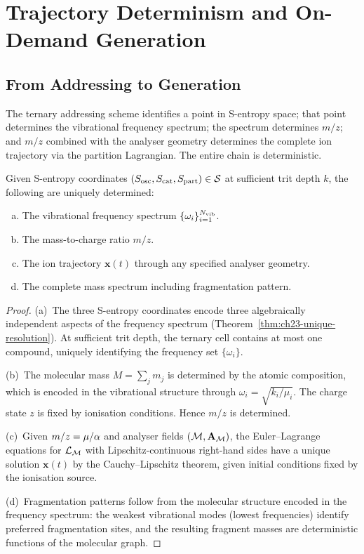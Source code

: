 \section{Trajectory Determinism and On-Demand Generation}
\label{sec:ch23-determinism}

\subsection{From Addressing to Generation}
\label{sec:ch23-address-to-gen}

The ternary addressing scheme identifies a point in S-entropy space;
that point determines the vibrational frequency spectrum; the spectrum
determines $m/z$; and $m/z$ combined with the analyser geometry determines
the complete ion trajectory via the partition Lagrangian.  The entire chain
is deterministic.

\begin{theorem}
\label{thm:ch23-determinism}
Given S-entropy coordinates $(S_{\mathrm{osc}}, S_{\mathrm{cat}}, S_{\mathrm{part}}) \in \mathcal{S}$ at sufficient
trit depth $k$, the following are uniquely determined:
\begin{enumerate}[(a)]
  \item The vibrational frequency spectrum $\{\omega_i\}_{i=1}^{N_{\mathrm{vib}}}$.
  \item The mass-to-charge ratio $m/z$.
  \item The ion trajectory $\mathbf{x}(t)$ through any specified analyser
    geometry.
  \item The complete mass spectrum including fragmentation pattern.
\end{enumerate}
\end{theorem}

\begin{proof}
(a)~The three S-entropy coordinates encode three algebraically independent
aspects of the frequency spectrum (Theorem~\ref{thm:ch23-unique-resolution}).
At sufficient trit depth, the ternary cell contains at most one compound,
uniquely identifying the frequency set $\{\omega_i\}$.

(b)~The molecular mass $M = \sum_j m_j$ is determined by the atomic
composition, which is encoded in the vibrational structure through $\omega_i =
\sqrt{k_i/\mu_i}$.  The charge state $z$ is fixed by ionisation conditions.
Hence $m/z$ is determined.

(c)~Given $m/z = \mu/\alpha$ and analyser fields $(\mathcal{M}, \mathbf{A}_{\mathcal{M}})$,
the Euler--Lagrange equations for $\mathcal{L}_{\mathcal{M}}$ with Lipschitz-continuous
right-hand sides have a unique solution $\mathbf{x}(t)$ by the Cauchy--Lipschitz
theorem, given initial conditions fixed by the ionisation source.

(d)~Fragmentation patterns follow from the molecular structure encoded in the
frequency spectrum: the weakest vibrational modes (lowest frequencies) identify
preferred fragmentation sites, and the resulting fragment masses are
deterministic functions of the molecular graph.
\end{proof}

